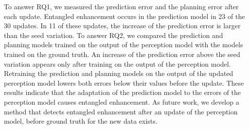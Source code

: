 \documentclass[conference]{IEEEtran}
\begin{document}
To answer RQ1, we measured the prediction error and the planning error after each update. Entangled enhancement occurs in the prediction model in 23 of the 30 updates. In 11 of these updates, the increase of the prediction error is larger than the seed variation. To answer RQ2, we compared the prediction and planning models trained on the output of the perception model with the models trained on the ground truth. An increase of the prediction error above the seed variation appears only after training on the output of the perception model. Retraining the prediction and planning models on the output of the updated perception model lowers both errors below their values before the update. These results indicate that the adaptation of the prediction model to the errors of the perception model causes entangled enhancement. As future work, we develop a method that detects entangled enhancement after an update of the perception model, before ground truth for the new data exists.



\end{document}
